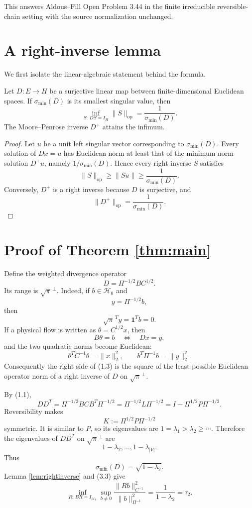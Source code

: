 \documentclass[11pt]{article}
\newcommand{\cH}{\mathcal H}
\newcommand{\one}{\mathbf 1}
\begin{document}
This answers Aldous--Fill Open Problem 3.44 in the finite irreducible reversible-chain setting with the source normalization unchanged.

\section{A right-inverse lemma}
We first isolate the linear-algebraic statement behind the formula.

\begin{lemma}\label{lem:rightinverse}
Let $D:E\to H$ be a surjective linear map between finite-dimensional Euclidean spaces. If $\sigma_{\min}(D)$ is its smallest singular value, then
\[
\inf_{S:\,DS=I_H}\|S\|_{\mathrm{op}}
=\frac1{\sigma_{\min}(D)}.
\tag{2.1}
\]
The Moore--Penrose inverse $D^+$ attains the infimum.
\end{lemma}

\begin{proof}
Let $u$ be a unit left singular vector corresponding to $\sigma_{\min}(D)$. Every solution of $Dx=u$ has Euclidean norm at least that of the minimum-norm solution $D^+u$, namely $1/\sigma_{\min}(D)$. Hence every right inverse $S$ satisfies
\[
\|S\|_{\mathrm{op}}\ge \|Su\|\ge \frac1{\sigma_{\min}(D)}.
\]
Conversely, $D^+$ is a right inverse because $D$ is surjective, and
\[
\|D^+\|_{\mathrm{op}}=\frac1{\sigma_{\min}(D)}.
\]
\end{proof}

\section{Proof of Theorem \ref{thm:main}}
Define the weighted divergence operator
\[
D=\Pi^{-1/2}BC^{1/2}.
\tag{3.1}
\]
Its range is $\sqrt\pi^{\,\perp}$. Indeed, if $b\in\cH_0$ and
\[
y=\Pi^{-1/2}b,
\]
then
\[
\sqrt\pi^{\,T}y=\one^Tb=0.
\]
If a physical flow is written as $\theta=C^{1/2}x$, then
\[
B\theta=b
\quad\Longleftrightarrow\quad
Dx=y,
\tag{3.2}
\]
and the two quadratic norms become Euclidean:
\[
\theta^TC^{-1}\theta=\|x\|_2^2,
\qquad
b^T\Pi^{-1}b=\|y\|_2^2.
\tag{3.3}
\]
Consequently the right side of (1.3) is the square of the least possible Euclidean operator norm of a right inverse of $D$ on $\sqrt\pi^{\,\perp}$.

By (1.1),
\[
DD^T
=\Pi^{-1/2}BCB^T\Pi^{-1/2}
=\Pi^{-1/2}L\Pi^{-1/2}
=I-\Pi^{1/2}P\Pi^{-1/2}.
\tag{3.4}
\]
Reversibility makes
\[
K:=\Pi^{1/2}P\Pi^{-1/2}
\]
symmetric. It is similar to $P$, so its eigenvalues are $1=\lambda_1>\lambda_2\ge\cdots$. Therefore the eigenvalues of $DD^T$ on $\sqrt\pi^{\,\perp}$ are
\[
1-\lambda_2,\ldots,1-\lambda_{|V|}.
\]
Thus
\[
\sigma_{\min}(D)=\sqrt{1-\lambda_2}.
\tag{3.5}
\]
Lemma \ref{lem:rightinverse} and (3.3) give
\[
\inf_{R:\,BR=I_{\cH_0}}
\sup_{b\ne0}
\frac{\|Rb\|_{C^{-1}}^2}{\|b\|_{\Pi^{-1}}^2}
=\frac1{1-\lambda_2}=\tau_2.
\]
\end{document}
